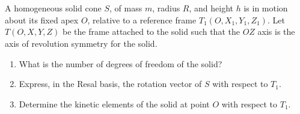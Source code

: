 \documentclass[12pt]{article}
\begin{document}
\section{}

A homogeneous solid cone $S$, of mass $m$, radius $R$, and height $h$ is in motion about its fixed apex $O$, relative to a reference frame $T_1(O, X_1, Y_1, Z_1)$. Let $T(O, X, Y, Z)$ be the frame attached to the solid such that the $OZ$ axis is the axis of revolution symmetry for the solid.

\begin{enumerate}
    \item What is the number of degrees of freedom of the solid?
    \item Express, in the Resal basis, the rotation vector of $S$ with respect to $T_1$.
    \item Determine the kinetic elements of the solid at point $O$ with respect to $T_1$.
\end{enumerate}
\end{document}

